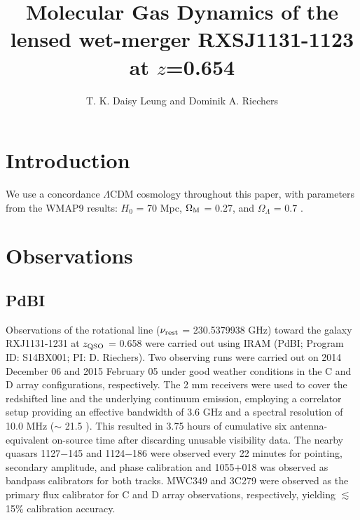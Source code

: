 \documentclass[]{emulateapj}
\begin{document}

\title{Molecular Gas Dynamics of the lensed wet-merger RXSJ1131-1123 at $z$=0.654}
\author{T. K. Daisy Leung and Dominik A. Riechers}

\begin{abstract}
\end{abstract}


\section{Introduction}
We use a concordance $\Lambda$CDM cosmology throughout this paper, with parameters from the WMAP9 results: $H_0$ = 70 \kms Mpc\pmOne, $\Omega_{\rm M}$ = 0.27, and $\Omega_{\Lambda}$ = 0.7 \citep{Hinshaw13a}.

\section{Observations}
\subsection{PdBI \bco} %
Observations of the \bco rotational line ($\nu_{\rm rest}$ = 230.5379938 GHz)
toward the \gl galaxy RXJ1131-1231 at $z_{\rm QSO}$ =
0.658 were carried out using IRAM \pdbi (PdBI; Program ID: S14BX001; PI: D.
Riechers). Two observing runs were carried out on 2014 December 06 and 2015
February 05 under good weather conditions in the C and D array configurations,
respectively. The 2 mm receivers were used to cover the redshifted \bco line
and the underlying continuum emission, employing a correlator setup providing
an effective bandwidth of 3.6 GHz and a spectral resolution of 10.0 MHz ($\sim$
21.5 \kms). This resulted in 3.75 hours of cumulative six antenna-equivalent on-source
 time after discarding unusable visibility data.
The nearby quasars 1127$-$145 and 1124$-$186 were observed every 22 minutes
for pointing, secondary amplitude, and phase calibration and 1055$+$018 was
observed as bandpass calibrators for both tracks.
MWC349 and 3C279 were observed as the primary flux calibrator for C and D
array observations, respectively, yielding $\lesssim$15\% calibration accuracy.
\end{document}
